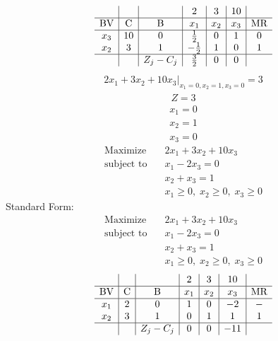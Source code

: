 \documentclass{article}
\begin{document}
\begin{align*}
\begin{array}{c|c|c|c|c|c|c}
 &  &  & 2 & 3 & 10 & \\
\hline
\text{BV} & \text{C} & \text{B} & x_{1} & x_{2} & x_{3} & \text{MR} \\
\hline
x_{3} & 10 & 0 & \frac{1}{2} & 0 & 1 & 0 \\
x_{2} & 3 & 1 & -\frac{1}{2} & 1 & 0 & 1 \\
\hline
 &  & Z_j-C_j & \frac{3}{2} & 0 & 0 & \\
\end{array}
\end{align*}
\begin{align*}
\left.2x_{1} + 3x_{2} + 10x_{3}\right|_{x_{1}=0,x_{2}=1,x_{3}=0}=3\end{align*}
\begin{align*}
Z=3\end{align*}
\begin{align*}
x_{1}=0\end{align*}
\begin{align*}
x_{2}=1\end{align*}
\begin{align*}
x_{3}=0\end{align*}
\begin{align*}
\text{Maximize} \quad & 2x_{1} + 3x_{2} + 10x_{3}\\
\text{subject to} \quad
& x_{1} - 2x_{3}=0\\
& x_{2} + x_{3}=1\\
& x_{1}\ge0,\; x_{2}\ge0,\; x_{3}\ge0\end{align*}
Standard Form:\\
\begin{align*}
\text{Maximize} \quad & 2x_{1} + 3x_{2} + 10x_{3}\\
\text{subject to} \quad
& x_{1} - 2x_{3}=0\\
& x_{2} + x_{3}=1\\
& x_{1}\ge0,\; x_{2}\ge0,\; x_{3}\ge0\end{align*}
\begin{align*}
\begin{array}{c|c|c|c|c|c|c}
 &  &  & 2 & 3 & 10 & \\
\hline
\text{BV} & \text{C} & \text{B} & x_{1} & x_{2} & x_{3} & \text{MR} \\
\hline
x_{1} & 2 & 0 & 1 & 0 & -2 & - \\
x_{2} & 3 & 1 & 0 & 1 & 1 & 1 \\
\hline
 &  & Z_j-C_j & 0 & 0 & -11 & \\
\end{array}
\end{align*}
\end{document}

